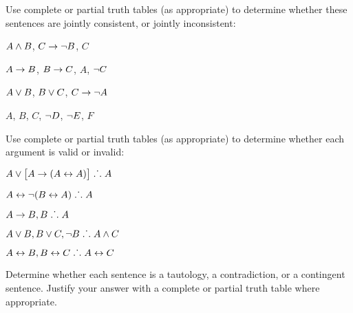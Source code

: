 \solutions
\problempart
\label{pr.TT.consistent}
Use complete or partial truth tables (as appropriate) to determine whether these sentences are jointly consistent, or jointly inconsistent:
\begin{earg}
\item $A \wedge B$, $C\rightarrow \neg B$, $C$ %
\item $A\rightarrow B$, $B\rightarrow C$, $A$, $\neg C$ %
\item $A \vee B$, $B\vee C$, $C\rightarrow \neg A$ %
\item $A$, $B$, $C$, $\neg D$, $\neg E$, $F$ %
\end{earg}

\solutions
\problempart
\label{pr.TT.valid}
Use complete or partial truth tables (as appropriate) to determine whether each argument is valid or invalid:
\begin{earg}
\item $A\vee\bigl[A\rightarrow(A\leftrightarrow A)\bigr] \mathrel{\ldotp\dot{}\,\ldotp} A$ %
\item $A\leftrightarrow\neg(B\leftrightarrow A) \mathrel{\ldotp\dot{}\,\ldotp} A$ %
\item $A\rightarrow B, B \mathrel{\ldotp\dot{}\,\ldotp} A$ %
\item $A\vee B, B\vee C, \neg B \mathrel{\ldotp\dot{}\,\ldotp} A \wedge C$ %
\item $A\leftrightarrow B, B\leftrightarrow C \mathrel{\ldotp\dot{}\,\ldotp} A\leftrightarrow C$ %
\end{earg}

\problempart
\label{pr.TT.TTorC}
Determine whether each sentence is a tautology, a contradiction, or a contingent sentence. Justify your answer with a complete or partial truth table where appropriate.


